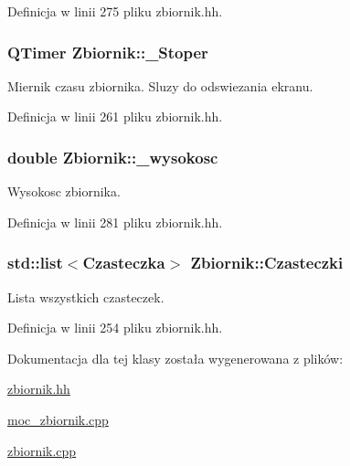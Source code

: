 Definicja w linii 275 pliku zbiornik.\-hh.

\hypertarget{class_zbiornik_a5ca8ac1357ef59110d4a9e12aae2bd99}{
\subsubsection[{\-\_\-\-Stoper}]{\setlength{\rightskip}{0pt plus 5cm}Q\-Timer Zbiornik\-::\-\_\-\-Stoper}}\label{class_zbiornik_a5ca8ac1357ef59110d4a9e12aae2bd99}
Miernik czasu zbiornika. Sluzy do odswiezania ekranu. 

Definicja w linii 261 pliku zbiornik.\-hh.

\hypertarget{class_zbiornik_abe4d7a4e2d39e802d656b03bb3afdd3f}{
\subsubsection[{\-\_\-wysokosc}]{\setlength{\rightskip}{0pt plus 5cm}double Zbiornik\-::\-\_\-wysokosc\hspace{0.3cm}{\ttfamily [private]}}}\label{class_zbiornik_abe4d7a4e2d39e802d656b03bb3afdd3f}
Wysokosc zbiornika. 

Definicja w linii 281 pliku zbiornik.\-hh.

\hypertarget{class_zbiornik_a751209f2f02a7eaf3b7a3283d8fcd3ad}{
\subsubsection[{Czasteczki}]{\setlength{\rightskip}{0pt plus 5cm}std\-::list$<${\bf Czasteczka}$>$ Zbiornik\-::\-Czasteczki}}\label{class_zbiornik_a751209f2f02a7eaf3b7a3283d8fcd3ad}
Lista wszystkich czasteczek. 

Definicja w linii 254 pliku zbiornik.\-hh.



Dokumentacja dla tej klasy została wygenerowana z plików\-:\begin{DoxyCompactItemize}
\item 
\hyperlink{zbiornik_8hh}{zbiornik.\-hh}\item 
\hyperlink{moc__zbiornik_8cpp}{moc\-\_\-zbiornik.\-cpp}\item 
\hyperlink{zbiornik_8cpp}{zbiornik.\-cpp}\end{DoxyCompactItemize}
